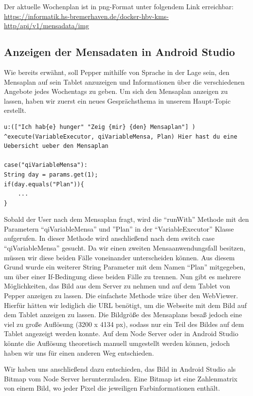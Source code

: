 Der aktuelle Wochenplan ist in png-Format unter folgendem Link erreichbar:\\
\url{https://informatik.hs-bremerhaven.de/docker-hbv-kms-http/api/v1/mensadata/img}


\subsection{Anzeigen der Mensadaten in Android Studio}

Wie bereits erwähnt, soll Pepper mithilfe von Sprache in der Lage sein, den Mensaplan auf sein Tablet anzuzeigen und Informationen 
über die verschiedenen Angebote jedes Wochentags zu geben. Um sich den Mensaplan anzeigen zu lassen, haben wir zuerst ein neues 
Gesprächsthema in unserem Haupt-Topic erstellt. 

\begin{lstlisting}
u:(["Ich hab{e} hunger" "Zeig {mir} {den} Mensaplan"] ) 
^execute(VariableExecutor, qiVariableMensa, Plan) Hier hast du eine 
Uebersicht ueber den Mensaplan

case("qiVariableMensa"):
String day = params.get(1);
if(day.equals("Plan")){
    ...
}
\end{lstlisting}

Sobald der User nach dem Mensaplan fragt, wird die ``runWith'' Methode mit den Parametern ``qiVariableMensa'' 
und ''Plan'' in der ``VariableExecutor'' Klasse aufgerufen. In dieser Methode wird anschließend nach dem switch 
case ``qiVariableMensa'' gesucht. Da wir einen zweiten Mensaanwendungsfall besitzen, müssen wir diese beiden Fälle 
voneinander unterscheiden können. Aus diesem Grund wurde ein weiterer String Parameter mit dem Namen ``Plan'' mitgegeben, 
um über einer If-Bedingung diese beiden Fälle zu trennen. 
Nun gibt es mehrere Möglichkeiten, das Bild aus dem Server zu nehmen und auf dem Tablet von Pepper anzeigen zu lassen. Die 
einfachste Methode wäre über den WebViewer. Hierfür hätten wir lediglich die URL benötigt, um die Webseite mit dem Bild auf dem 
Tablet anzeigen zu lassen. Die Bildgröße des Mensaplans besaß jedoch eine viel zu große Auflösung (3200 x 4134 px), sodass nur ein 
Teil des Bildes auf dem Tablet angezeigt werden konnte.
Auf dem Node Server oder in Android Studio könnte die Auflösung theoretisch manuell umgestellt werden können, jedoch haben wir uns 
für einen anderen Weg entschieden. 

Wir haben uns anschließend dazu entschieden, das Bild in Android Studio als Bitmap vom Node Server herunterzuladen. Eine Bitmap 
ist eine Zahlenmatrix von einem Bild, wo jeder Pixel die jeweiligen Farbinformationen enthält.


